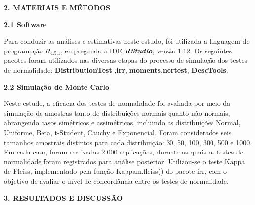 \documentclass[final]{beamer}
\begin{document}
\begin{frame}[t]
\begin{columns}[t,totalwidth=0.6\paperwidth]
\begin{column}{0.45\paperwidth}
\vspace{1.3cm}
{\large\bfseries 2. MATERIAIS E MÉTODOS}\par
\justifying
\vspace{1.3cm}

{\large\bfseries 2.1 Software}\par

Para conduzir as análises e estimativas neste estudo, foi utilizada a linguagem de programação \textbf{$R_{4.5.1}$}, empregando a IDE \href{https://posit.co/download/rstudio-desktop/}{\textit{\textbf{RStudio}}}, versão 1.12. Os seguintes pacotes foram utilizados nas diversas etapas do processo de simulação dos testes de normalidade: \textbf{DistributionTest} ,\textbf{irr}, \textbf{moments},\textbf{nortest}, \textbf{DescTools}.  

\vspace{1.3cm}
{\large\bfseries 2.2 Simulação de Monte Carlo}\par

Neste estudo, a eficácia dos testes de normalidade foi avaliada por meio da simulação de amostras tanto de distribuições normais quanto não normais, abrangendo casos simétricos e assimétricos, incluindo as distribuições Normal, Uniforme, Beta, t-Student, Cauchy e Exponencial. Foram considerados seis tamanhos amostrais distintos para cada distribuição: 30, 50, 100, 300,
500 e 1000. Em cada caso, foram realizadas 2.000 replicações, durante as quais os testes de normalidade foram registrados para análise posterior. Utilizou-se o teste Kappa de Fleiss, implementado pela função Kappam.fleiss() do pacote irr, com o objetivo de avaliar o nível de concordância entre os testes de normalidade.



 \vspace{1em}
{\large\bfseries 3. RESULTADOS E DISCUSSÃO}\par
\justifying
\vspace{1.3cm}


\vspace{0.5cm}



\end{column}
\end{columns}
\end{frame}
\end{document}
